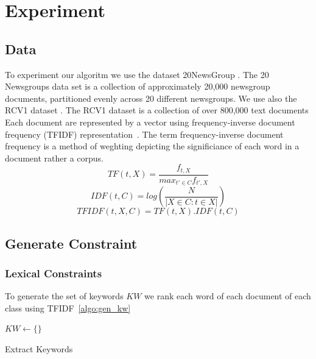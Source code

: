 \section{Experiment}

\subsection{Data}
To experiment our algoritm we use the dataset 20NewsGroup \cite{Newsgroups20}.
The 20 Newsgroups data set is a collection of approximately 20,000 newsgroup 
documents, partitioned evenly across 20 different newsgroups. We use also the 
RCV1 dataset \cite{Lewis:2004:RNB:1005332.1005345}. The RCV1 dataset is a 
collection of over 800,000 text documents\\
Each document are represented by a vector using frequency-inverse document 
frequency (TFIDF) representation~\cite{doi:10.1108/eb026526}.
The term frequency-inverse document frequency is a method of weghting depicting 
the significiance of each word in a document rather a corpus.
\begin{equation}
TF(t, X) = \frac{f_{t, X}}{max_{t' \in C}f_{t', X}} 
\end{equation}
\begin{equation}
IDF(t, C) = log(\frac{N}{|X \in C : t \in X|})
\end{equation}
\begin{equation}
TFIDF(t,X,C) = TF(t, X) . IDF(t, C)   
\end{equation}
\subsection{Generate Constraint}
\subsubsection{Lexical Constraints}
To generate the set of keywords $KW$ we rank each word of each 
document of each class using TFIDF~\ref{algo:gen_kw}
\begin{algorithm}
  $KW \gets \{\}$\\
  \caption{\label{algo:gen_kw}Extract Keywords}
\end{algorithm}
